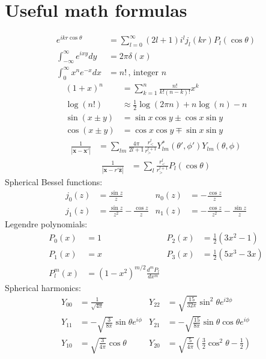 \documentclass[10pt,twocolumn]{article}
\newcommand{\x}{\mathbf{x}}
\begin{document}
  \section{Useful math formulas}
  \begin{align*}
    e^{ikr\cos\theta} &= \sum_{l=0}^\infty (2l+1)i^lj_l(kr)P_l(\cos\theta)
    \\
    \int_{-\infty}^\infty e^{ixy} dy &= 2\pi\delta(x)\\
    \int_0^\infty x^ne^{-x} dx &= n!\,,\, \text{integer }n
  \end{align*}
  \begin{align*}
    (1+x)^n &= \sum_{k=1}^n \frac{n!}{k!(n-k)!}x^k \\
    \log(n!) &\approx \frac12 \log(2\pi n) + n\log(n) - n \\
    \sin(x\pm y) &= \sin x\cos y \pm \cos x\sin y \\
    \cos(x \pm y) &= \cos x\cos y \mp \sin x\sin y
  \end{align*}
  \begin{align*}
    \frac1{|\x - \x'|} &=
    \sum_{lm} \frac{4\pi}{2l+1} \frac{r_<^l}{r_>^{l+1}}
    Y_{lm}^*(\theta',\phi')
    Y_{lm}(\theta,\phi)
  \end{align*}
  \begin{align*}
    \frac1{|\x - r'\mathbf{\hat{z}}|} &=
    \sum_{l} \frac{r_<^l}{r_>^{l+1}} P_l(\cos\theta)
  \end{align*}
  Spherical Bessel functions:
  \begin{align*}
    j_0(z) &= \frac{\sin z}{z} &     n_0(z) &= -\frac{\cos z}z \\
    j_1(z) &= \frac{\sin z}{z^2} - \frac{\cos z}z &
    n_1(z) &= -\frac{\cos z}{z^2} - \frac{\sin z}z
  \end{align*}
  Legendre polynomials:
  \begin{align*}
    P_0(x) &= 1 & P_2(x) &= \frac12\left(3x^2-1\right) \\
    P_1(x) &= x & P_3(x) &= \frac12\left(5x^3-3x\right) \\
    P_l^m(x) &= \left(1-x^2\right)^{m/2} \frac{d^mP_l}{dx^m}
  \end{align*}
  Spherical harmonics:
  \begin{align*}
    Y_{00} &= \frac1{\sqrt{4\pi}}
    & Y_{22} &= \sqrt{\frac{15}{32\pi}}\sin^2\theta e^{i2\phi} \\
    Y_{11} &= -\sqrt{\frac{3}{8\pi}}\sin\theta e^{i\phi}
    & Y_{21} &= -\sqrt{\frac{15}{8\pi}}\sin\theta\cos\theta e^{i\phi} \\
    Y_{10} &= \sqrt{\frac{3}{4\pi}}\cos\theta
    & Y_{20} &= \sqrt{\frac{5}{4\pi}}\left( \frac32 \cos^2\theta - \frac12
    \right)
  \end{align*}
\end{document}
